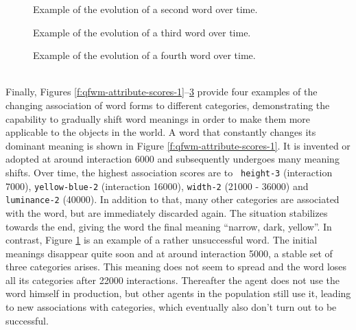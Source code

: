 \begin{figure}[t]
  \caption{Example of the evolution of a second word over time.}
  \label{f:qfwm-attribute-scores-2}
\end{figure}

\begin{figure}[t]
  \caption{Example of the evolution of a third word over time.}
  \label{f:qfwm-attribute-scores-3}
\end{figure}

\begin{figure}[t]
  \caption{Example of the evolution of a fourth word over time.}
  \label{f:qfwm-attribute-scores-4}
\end{figure}

\stopfiguregroup

~\\

Finally, Figures
\ref{f:qfwm-attribute-scores-1}--\ref{f:qfwm-attribute-scores-4}
provide four examples of the changing association of word forms to
different categories, demonstrating the capability to gradually shift
word meanings in order to make them more applicable to the objects in
the world. A word that constantly changes its dominant meaning is
shown in Figure
\ref{f:qfwm-attribute-scores-1}. It is invented
or adopted at around interaction 6000 and subsequently undergoes many
meaning shifts.  Over time, the highest association scores are to {\tt
  height-3} (interaction 7000), {\tt yellow-blue-2} (interaction
16000), {\tt width-2} (21000 - 36000) and {\tt luminance-2} (40000).
In addition to that, many other categories are associated with the
word, but are immediately discarded again. The situation stabilizes
towards the end, giving the word the final meaning ``narrow, dark,
yellow''.  In contrast, Figure
\ref{f:qfwm-attribute-scores-2} is an example of
a rather unsuccessful word. The initial meanings disappear quite soon
and at around interaction 5000, a stable set of three categories
arises. This meaning does not seem to spread and the word loses all
its categories after 22000 interactions.  Thereafter the agent does
not use the word himself in production, but other agents in the
population still use it, leading to new associations with categories,
which eventually also don't turn out to be successful.

